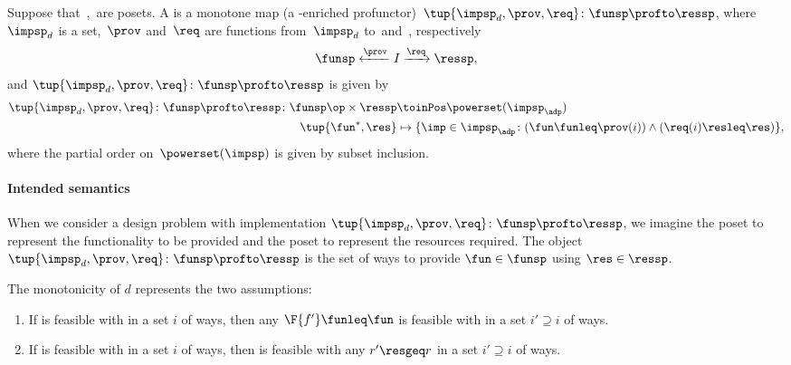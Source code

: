 \begin{definition}
  \label{def:dpwithimp}
  Suppose that~\funsp,~\ressp are posets. A \emph{} is a monotone map (a \Set-enriched profunctor)~$\tup{\impsp_d,\prov,\req}\colon \funsp\profto \ressp$, where~$\impsp_d$ is a set,~$\prov$ and~$\req$ are functions from~$\impsp_d$ to~\funsp and~\ressp, respectively
  \begin{equation*}
    \funsp \xleftarrow{\prov} I \xrightarrow{\req} \ressp,
  \end{equation*}
  and $\tup{\impsp_d,\prov,\req}\colon \funsp\profto \ressp$ is given by
  \begin{equation*}
    \begin{aligned}
      \tup{\impsp_d,\prov,\req}\colon \funsp\profto \ressp \colon \funsp\op \times \ressp &\toinPos \powerset(\impsp_\adp) \\
      \tup{\fun^*, \res} &\mapsto \{ \imp \in \impsp_\adp \colon ( \fun \funleq \prov(i)) \wedge (\req(i) \resleq \res) \},
    \end{aligned}
  \end{equation*}
  where the partial order on~$\powerset(\impsp)$ is given by subset inclusion.
\end{definition}

\paragraph{Intended semantics} When we consider a design problem with implementation $\tup{\impsp_d, \prov, \req}\colon \funsp\profto \ressp$, we imagine the poset \funsp to represent the functionality to be provided and the poset \ressp to represent the resources required. The object $\tup{\impsp_d,\prov,\req}\colon \funsp\profto \ressp$ is the set of ways to provide $\fun\in \funsp$ using $\res\in \ressp$.

\noindent The monotonicity of $d$ represents the two assumptions:
\begin{enumerate}
  \item If \fun is feasible with \res in a set $i$ of ways, then any $\F{f'}\funleq \fun$ is feasible with \res in a set $i'\supseteq i$ of ways.
  \item If \fun is feasible with \res in a set $i$ of ways, then \fun is feasible with any $r'\resgeq r$ in a set $i'\supseteq i$ of ways.
\end{enumerate}

